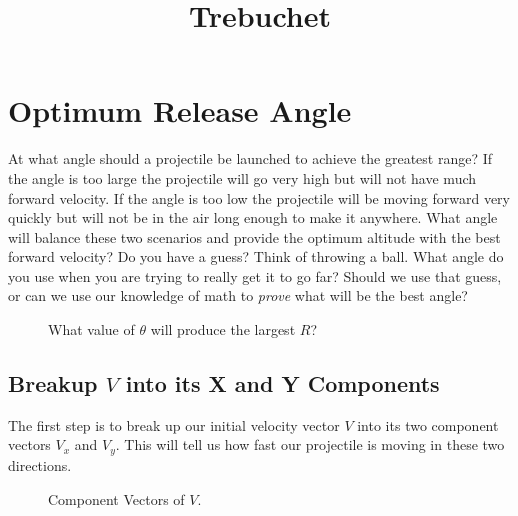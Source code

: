 \documentclass[10pt,a4paper]{article}
\begin{document}
\title{Trebuchet}
	\section{Optimum Release Angle}
		At what angle should a projectile be launched to achieve the greatest range?
		If the angle is too large the projectile will go very high but will not have much forward velocity.
		If the angle is too low the projectile will be moving forward very quickly but will not be in the air long enough to make it anywhere.
		What angle will balance these two scenarios and provide the optimum altitude with the best forward velocity?
		Do you have a guess? Think of throwing a ball. What angle do you use when you are trying to really get it to go far?
		Should we use that guess, or can we use our knowledge of math to \emph{prove} what will be the best angle?
		
		\begin{figure}
		\caption{What value of $\theta$ will produce the largest $R$?}
		\label{fig:launchAngle}
		\end{figure}
		
	\subsection{Breakup $V$ into its  X and Y Components}
		The first step is to break up our initial velocity vector $V$ into its two component vectors $V_x$ and $V_y$.
		This will tell us how fast our projectile is moving in these two directions.
		
		\begin{wrapfigure}{l}{0.44\textwidth}
		\caption{Component Vectors of $V$.}
		\label{fig:componentVectors}
		\end{wrapfigure}
		
\end{document}
